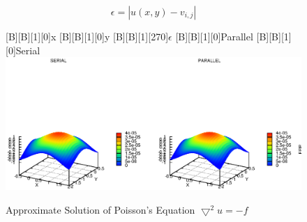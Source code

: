 \documentclass[12pt,a4paper]{report}
\begin{document}
\begin{equation}
  \label{eq:error}
  \epsilon=|u(x,y)-v_{i,j}|
\end{equation}

\begin{figure}[htb]
  [B][B][1][0]{x}
  [B][B][1][0]{y}
  [B][B][1][270]{$\epsilon$}
  [B][B][1][0]{Parallel}
  [B][B][1][0]{Serial}
  \includegraphics{./images/poiss.eps}
  \caption{Approximate Solution of Poisson's Equation
    $\bigtriangledown^{2}u=-f$}
  \label{fig:approxPoiss}
\end{figure}
    
\end{document}
